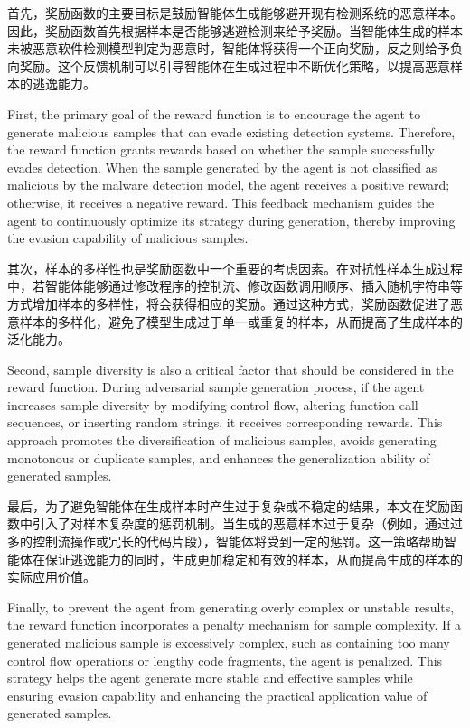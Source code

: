 首先，奖励函数的主要目标是鼓励智能体生成能够避开现有检测系统的恶意样本。因此，奖励函数首先根据样本是否能够逃避检测来给予奖励。当智能体生成的样本未被恶意软件检测模型判定为恶意时，智能体将获得一个正向奖励，反之则给予负向奖励。这个反馈机制可以引导智能体在生成过程中不断优化策略，以提高恶意样本的逃逸能力。

First, the primary goal of the reward function is to encourage the agent to generate malicious samples that can evade existing detection systems. Therefore, the reward function grants rewards based on whether the sample successfully evades detection. When the sample generated by the agent is not classified as malicious by the malware detection model, the agent receives a positive reward; otherwise, it receives a negative reward. This feedback mechanism guides the agent to continuously optimize its strategy during generation, thereby improving the evasion capability of malicious samples.

其次，样本的多样性也是奖励函数中一个重要的考虑因素。在对抗性样本生成过程中，若智能体能够通过修改程序的控制流、修改函数调用顺序、插入随机字符串等方式增加样本的多样性，将会获得相应的奖励。通过这种方式，奖励函数促进了恶意样本的多样化，避免了模型生成过于单一或重复的样本，从而提高了生成样本的泛化能力。

Second, sample diversity is also a critical factor that should be considered in the reward function. During adversarial sample generation process, if the agent increases sample diversity by modifying control flow, altering function call sequences, or inserting random strings, it receives corresponding rewards. This approach promotes the diversification of malicious samples, avoids generating monotonous or duplicate samples, and enhances the generalization ability of generated samples.

最后，为了避免智能体在生成样本时产生过于复杂或不稳定的结果，本文在奖励函数中引入了对样本复杂度的惩罚机制。当生成的恶意样本过于复杂（例如，通过过多的控制流操作或冗长的代码片段），智能体将受到一定的惩罚。这一策略帮助智能体在保证逃逸能力的同时，生成更加稳定和有效的样本，从而提高生成的样本的实际应用价值。

Finally, to prevent the agent from generating overly complex or unstable results, the reward function incorporates a penalty mechanism for sample complexity. If a generated malicious sample is excessively complex, such as containing too many control flow operations or lengthy code fragments, the agent is penalized. This strategy helps the agent generate more stable and effective samples while ensuring evasion capability and enhancing the practical application value of generated samples.

